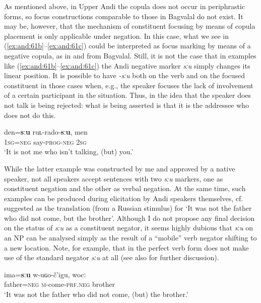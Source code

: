 \documentclass[output=paper,colorlinks=true, citecolor=brown]{langscibook}
\begin{document}
As mentioned above, in Upper Andi the copula does not occur in periphrastic forms, so focus constructions comparable to those in Bagvalal do not exist. It may be, however, that the mechanism of constituent focusing by means of copula placement is only applicable under negation. In this case, what we see in (\ref{ex:and:61b}--\ref{ex:and:61c}) could be interpreted as focus marking by means of a negative copula, as in  and  from Bagvalal. Still, it is not the case that in examples like (\ref{ex:and:61b}--\ref{ex:and:61c}) the Andi negative marker \textit{sːu} simply changes its linear position. It is possible to have \textit{\nobreakdash-sːu} both on the verb and on the focused constituent in those cases when, e.g., the speaker focuses the lack of involvement of a certain participant in the situation. Thus, in  the idea that the speaker does not talk is being rejected: what is being asserted is that it is the addressee who does not do this.

\ea
    \label{ex:and:66}
    \gll den=\textbf{sːu} ruʟ-rado-\textbf{sːu}, men\\
          \textsc{1sg}=\textsc{neg} say-\textsc{prog-neg} \textsc{2sg} \\
    \glt ‘It is not me who isn’t talking, (but) you.’
\z 

While the latter example was constructed by me and approved by a native speaker, not all speakers accept sentences with two \textit{sːu} markers, one as constituent negation and the other as verbal negation. At the same time, such examples can be produced during elicitation by Andi speakers themselves, cf.  suggested as the translation (from a Russian stimulus) for ‘It was not the father who did not come, but the brother’. Although I do not propose any final decision on the status of \textit{sːu} as a constituent negator, it seems highly dubious that \textit{sːu} on an NP can be analysed simply as the result of a “mobile” verb negator shifting to a new location. Note, for example, that in  the perfect verb form does not make use of the standard negator \textit{sːu} at all (see also  for further discussion).

\ea
    \label{ex:and:67}
    \gll ima=\textbf{sːu} w-uɢo-č’igu, wocː\\
          father=\textsc{neg} \textsc{m}{}-come-\textsc{prf.neg} brother \\
    \glt ‘It was not the father who did not come, (but) the brother.’
\z 
\end{document}

